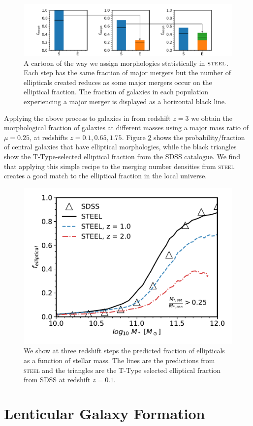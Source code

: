 \begin{figure}[h]
	\centering
	\includegraphics[width = \linewidth]{Figures/Chapter5/Morphology_Evolution.png}
	\caption{A cartoon of the way we assign morphologies statistically in $\textsc{steel}$. Each step has the same fraction of major mergers but the number of ellipticals created reduces as some major mergers occur on the elliptical fraction. The fraction of galaxies in each population experiencing a major merger is displayed as a horizontal black line.}
	\label{fig:Gal_Morph_toon}
\end{figure}

Applying the above process to galaxies in \steel from redshift $z = 3$ we obtain the morphological fraction of galaxies at different masses using a major mass ratio of $\mu = 0.25$, at redshifts $z = 0.1, 0.65, 1.75$. Figure \ref{fig:Gal_Morph} shows the probability/fraction of central galaxies that have elliptical morphologies, while the black triangles show the T-Type-selected elliptical fraction from the SDSS catalogue. We find that applying this simple recipe to the merging number densities from \textsc{steel} creates a good match to the elliptical fraction in the local universe.

\begin{figure}[h]
	\centering
	\includegraphics[width = \linewidth]{Figures/Chapter5/GalaxyMorphologies.pdf}
	\caption{We show at three redshift steps the predicted fraction of ellipticals as a function of stellar mass. The lines are the predictions from \textsc{steel} and the triangles are the T-Type selected elliptical fraction from SDSS at redshift $z = 0.1$.}
	\label{fig:Gal_Morph}
\end{figure}


\section{Lenticular Galaxy Formation}
